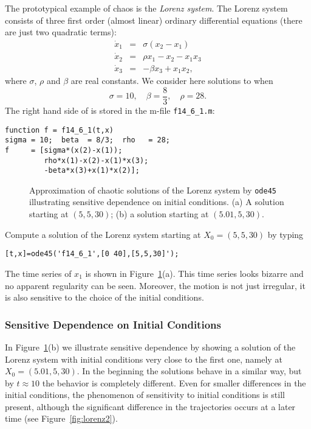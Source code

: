The prototypical example of chaos is the {\em Lorenz system}. 
  The Lorenz system consists of three first order 
(almost linear) ordinary differential equations (there are just two quadratic 
terms):
\begin{equation*}  \label{e:Lorenz}
\begin{array}{rcl}
\dot{x}_1 & = & \sigma(x_2-x_1)\\
\dot{x}_2 & = & \rho x_1 - x_2 - x_1x_3\\
\dot{x}_3 & = & -\beta x_3 + x_1x_2,
\end{array}
\end{equation*}
where $\sigma$, $\rho$ and $\beta$ are real constants.  We consider here
solutions to  when
\[
\sigma=10,\quad \beta=\frac{8}{3},\quad \rho=28.
\]
The right hand side of  is stored in the m-file {\tt f14\_6\_1.m}:
\begin{verbatim}
function f = f14_6_1(t,x)
sigma = 10;  beta  = 8/3;  rho   = 28;
f     = [sigma*(x(2)-x(1));
         rho*x(1)-x(2)-x(1)*x(3);
         -beta*x(3)+x(1)*x(2)];
\end{verbatim}

\begin{figure}[bht]
   \centerline{%
   }
   \caption{Approximation of chaotic solutions of the Lorenz system by 
	{\tt ode45} illustrating sensitive dependence on initial conditions.  
	(a) A solution starting at $(5,5,30)$;  (b) a solution starting at 
	$(5.01,5,30)$.}
   \label{fig:lorenz1}
\end{figure}

Compute a solution of the Lorenz system starting at 
$X_0=(5,5,30)$ by typing
\begin{verbatim}
[t,x]=ode45('f14_6_1',[0 40],[5,5,30]');
\end{verbatim}
The time series of $x_1$ is shown in Figure~\ref{fig:lorenz1}(a).  This time 
series looks bizarre and no apparent regularity can be seen.  Moreover, the 
motion is not just irregular, it is also sensitive to the choice of the initial 
conditions.  


\subsubsection*{Sensitive Dependence on Initial Conditions}

In Figure~\ref{fig:lorenz1}(b) we illustrate sensitive dependence by showing  
a solution of the Lorenz system with initial conditions 
very close to the first one, namely at $X_0=(5.01,5,30)$.  In the beginning 
the solutions behave in a similar way, but by $t\approx 10$ the behavior is 
completely different.  Even for smaller 
differences in the initial conditions, the phenomenon of sensitivity to 
initial conditions is still present, although the significant difference in 
the trajectories occurs at a later time (see Figure~\ref{fig:lorenz2}).  

